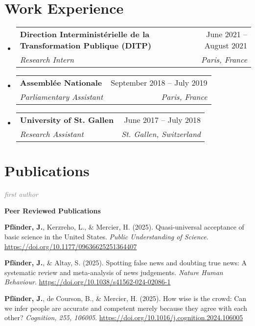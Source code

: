 \documentclass[letterpaper,11pt]{article}
\makeatletter
\newcommand{\resumeItem}[1]{
  \item\small{
    {#1 \vspace{-2pt}}
  }
}
\newcommand{\resumeSubheading}[4]{
  \vspace{1pt}\item
    \begin{tabular*}{0.97\textwidth}[t]{l@{\extracolsep{\fill}}r}
      \textbf{#1} & #2 \\
      \textit{\small#3} & \textit{\small #4} \\
    \end{tabular*}\vspace{-7pt}
}
\newcommand{\resumeSubSubheading}[2]{
    \item
    \begin{tabular*}{0.97\textwidth}{l@{\extracolsep{\fill}}r}
      \textit{\small#1} & \textit{\small #2} \\
    \end{tabular*}\vspace{-7pt}
}
\newcommand{\resumePublicationHeading}[1]{
  \vspace{5pt} %
  \noindent\textbf{\small #1} %
  \vspace{2pt} %
}
\newcommand{\resumeSubHeadingListStart}{\begin{itemize}[leftmargin=0.15in, label={}]}
\newcommand{\resumeSubHeadingListEnd}{\end{itemize}}
\newcommand{\resumeItemListStart}{\begin{itemize}}
\newcommand{\resumeItemListEnd}{\end{itemize}\vspace{-5pt}}
\makeatother
\begin{document}
\section{Work Experience}
  \resumeSubHeadingListStart

    \resumeSubheading
      {Direction Interministérielle de la Transformation Publique (DITP)}{June 2021 -- August 2021}
      {Research Intern}{Paris, France}
      
    \resumeSubheading
      {Assemblée Nationale}{September 2018 -- July 2019}
      {Parliamentary Assistant}{Paris, France}

    \resumeSubheading
      {University of St. Gallen}{June 2017 -- July 2018}
      {Research Assistant}{St. Gallen, Switzerland}
      

  \resumeSubHeadingListEnd

\section{Publications}


\small

\noindent\textcolor{gray}{\textit{\footnotemark[1]first author}}
\vspace{5pt} %

\resumePublicationHeading{Peer Reviewed Publications}
\begin{enumerate}[label={[{\arabic*.}]}, left=0.15in]
    \resumeItem{\textbf{Pfänder, J.\footnotemark[1]}, Kerzreho, L., & Mercier, H. (2025). Quasi-universal acceptance of basic science in the United States. \emph{Public Understanding of Science}. \url{https://doi.org/10.1177/09636625251364407}
    }
    \resumeItem{\textbf{Pfänder, J.\footnotemark[1]}, \& Altay, S. (2025). Spotting false news and doubting true news: A systematic review and meta-analysis of news judgements. \emph{Nature Human Behaviour}. \url{https://doi.org/10.1038/s41562-024-02086-1}
    }
    \resumeItem{\textbf{Pfänder, J.\footnotemark[1]}, de Courson, B., & Mercier, H. (2025). How wise is the crowd: Can we infer people are accurate and competent merely because they agree with each other? \emph{Cognition, 255, 106005}. \url{https://doi.org/10.1016/j.cognition.2024.106005}
    }

\end{enumerate}
\end{document}
